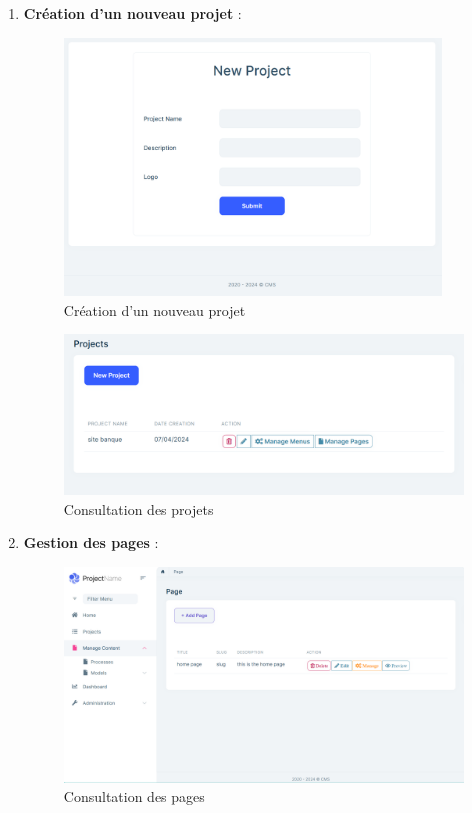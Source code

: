 \begin{enumerate}
    \item \textbf{Création d’un nouveau projet} :
    


\begin{figure}[H] 
    \centering
    \includegraphics[width=10cm]{Figures/new project.PNG}
    \caption{Création d'un nouveau projet}
\end{figure}

\begin{figure}[H] 
    \centering
    \includegraphics[width=17cm]{Figures/list projects.PNG}
    \caption{Consultation des projets}
\end{figure}



\item \textbf{Gestion des pages} :

\begin{figure}[H] 
    \centering
    \includegraphics[width=17cm]{Figures/list pages.PNG}
    \caption{Consultation des pages}
\end{figure}



\end{enumerate}
